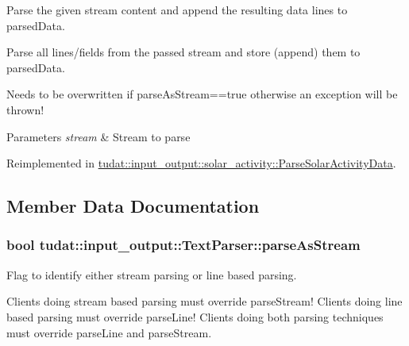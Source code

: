 Parse the given stream content and append the resulting data lines to parsed\+Data. 

Parse all lines/fields from the passed stream and store (append) them to parsed\+Data.

Needs to be overwritten if parse\+As\+Stream==true otherwise an exception will be thrown!


\begin{DoxyParams}{Parameters}
{\em stream} & Stream to parse \\
\hline
\end{DoxyParams}


Reimplemented in \hyperlink{classtudat_1_1input__output_1_1solar__activity_1_1ParseSolarActivityData_a8f56e590afa7f4de81e729f308509d37}{tudat\+::input\+\_\+output\+::solar\+\_\+activity\+::\+Parse\+Solar\+Activity\+Data}.



\subsection{Member Data Documentation}
\subsubsection[{\texorpdfstring{parse\+As\+Stream}{parseAsStream}}]{\setlength{\rightskip}{0pt plus 5cm}bool tudat\+::input\+\_\+output\+::\+Text\+Parser\+::parse\+As\+Stream\hspace{0.3cm}{\ttfamily [protected]}}\hypertarget{classtudat_1_1input__output_1_1TextParser_a0523e93af363869e44119419880c41e4}{}\label{classtudat_1_1input__output_1_1TextParser_a0523e93af363869e44119419880c41e4}


Flag to identify either stream parsing or line based parsing. 

Clients doing stream based parsing must override parse\+Stream! Clients doing line based parsing must override parse\+Line! Clients doing both parsing techniques must override parse\+Line and parse\+Stream. 
